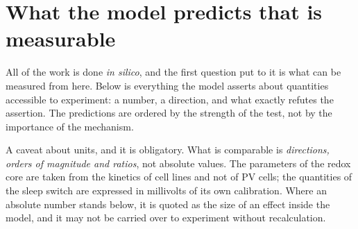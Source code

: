 \section{What the model predicts that is measurable}\label{sec:pred}
All of the work is done \emph{in silico}, and the first question put to it is what can be measured from here. Below is everything the model asserts about quantities accessible to experiment: a number, a direction, and what exactly refutes the assertion. The predictions are ordered by the strength of the test, not by the importance of the mechanism.

\begin{note}
A caveat about units, and it is obligatory. What is comparable is \emph{directions, orders of magnitude and ratios}, not absolute values. The parameters of the redox core are taken from the kinetics of cell lines and not of PV cells; the quantities of the sleep switch are expressed in millivolts of its own calibration. Where an absolute number stands below, it is quoted as the size of an effect inside the model, and it may not be carried over to experiment without recalculation.
\end{note}

